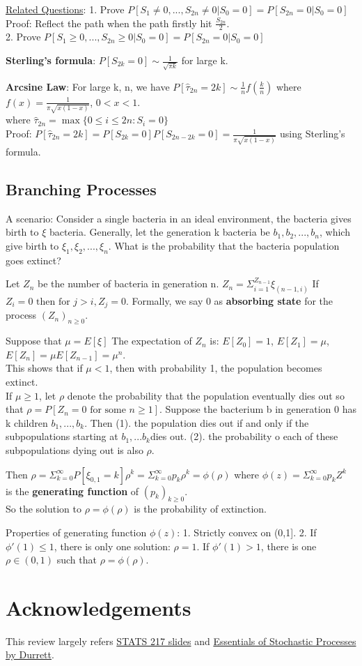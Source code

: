 \documentclass{article}
\begin{document}
\underline{Related Questions}: 1. Prove $P[S_1\neq0,...,S_{2n}\neq0|S_0=0] = P[S_{2n}=0|S_0=0]$\\
Proof: Reflect the path when the path firstly hit $\frac{S_{2n}}{2}$.\\
2. Prove $P[S_1\geq0,...,S_{2n}\geq0|S_0=0] = P[S_{2n}=0|S_0=0]$\par
\textbf{Sterling's formula}: $P[S_{2k}=0]\sim \frac{1}{\sqrt{\pi k}}$ for large k.\par
\textbf{Arcsine Law}: For large k, n, we have $P[\hat{\tau}_{2n}=2k]\sim \frac{1}{n}f(\frac{k}{n})$ where $f(x) = \frac{1}{\pi\sqrt{x(1-x)}}$, $0<x<1$.\\
where $\hat{\tau}_{2n}=\max\{0\leq i\leq 2n: S_i = 0\}$\\
Proof: $P[\hat{\tau}_{2n}=2k] = P[S_{2k}=0]P[S_{2n-2k}=0]=\frac{1}{\pi\sqrt{x(1-x)}}$ using Sterling's formula.

\subsection{Branching Processes}
A scenario: Consider a single bacteria in an ideal environment, the bacteria gives birth to $\xi$ bacteria. Generally, let the generation k bacteria be {$b_1, b_2,...,b_n$}, which give birth to $\xi_1,\xi_2,...,\xi_n$. What is the probability that the bacteria population goes extinct?\par
Let $Z_n$ be the number of bacteria in generation n. $Z_n = \Sigma_{i=1}^{Z_{n-1}}\xi_{(n-1,i)}$ If $Z_i=0\text{ then for } j>i, Z_j=0$. Formally, we say 0 as \textbf{absorbing state} for the process $(Z_n)_{n\geq0}$.\par
Suppose that $\mu = E[\xi]$ The expectation of $Z_n$ is: 
$E[Z_0]=1$, $E[Z_1] = \mu$, $E[Z_n]=\mu E[Z_{n-1}]=\mu^n$.\\
This shows that if $\mu < 1$, then with probability 1, the population becomes extinct.\\
If $\mu \geq 1$, let $\rho$ denote the probability that the population eventually dies out so that $\rho = P[Z_n=0 \text{ for some }n\geq1]$. Suppose the bacterium b in generation 0 has k children $b_1,...,b_k$. Then (1). the population dies out if and only if the subpopulations starting at $b_1,...b_k$dies out. (2). the probability o each of these subpopulations dying out is also $\rho$.\par
Then $\rho = \Sigma_{k=0}^{\infty}P[\xi_{0,1}=k]\rho^k=\Sigma_{k=0}^{\infty}p_k\rho^k = \phi(\rho)$ where $\phi(z) = \Sigma_{k=0}^{\infty}p_kZ^k$ is the \textbf{generating function} of $(p_k)_{k\geq0}$.\\
So the solution to $\rho = \phi(\rho)$ is the probability of extinction.\par
Properties of generating function $\phi(z)$: 1. Strictly convex on (0,1]. 2. If $\phi\prime(1)\leq1$, there is only one solution: $\rho = 1$. If $\phi\prime(1)>1$, there is one $\rho \in (0,1)$ such that $\rho = \phi(\rho)$.
\section{Acknowledgements}
This review largely refers \href{https://jainvishesh.github.io/STATS217_Winter2021.html}{STATS 217 slides} and \href{https://services.math.duke.edu/~rtd/EOSP/EOSP2E.pdf}{Essentials of Stochastic Processes by Durrett}.
\end{document}
